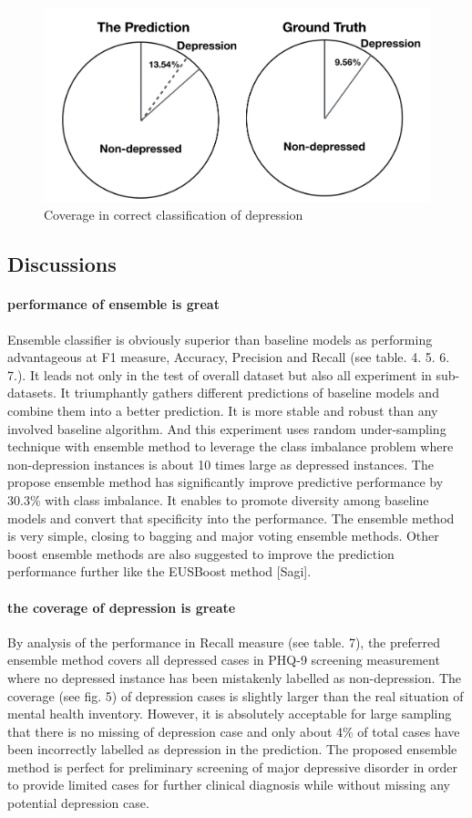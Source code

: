 \documentclass[runningheads]{llncs}
\begin{document}
\begin{figure}[h]
\includegraphics[width=1\textwidth]{coverage.png}
\caption{Coverage in correct classification of depression} \label{fig5}
\end{figure}
%
%
%
%
%
%
\subsection{Discussions}
\paragraph{performance of ensemble is great}
Ensemble classifier is obviously superior than baseline models as performing advantageous at F1 measure, Accuracy, Precision and Recall (see table. 4. 5. 6. 7.). It leads not only in the test of overall dataset but also all experiment in sub-datasets. It triumphantly gathers different predictions of baseline models and combine them into a better prediction. It is more stable and robust than any involved baseline algorithm. And this experiment uses random under-sampling technique with ensemble method to leverage the class imbalance problem where non-depression instances is about 10 times large as depressed instances. The propose ensemble method has significantly improve predictive performance by 30.3\% with class imbalance. It enables to promote diversity among baseline models and convert that specificity into the performance. The ensemble method is very simple, closing to bagging and major voting ensemble methods. Other boost ensemble methods are also suggested to improve the prediction performance further like the EUSBoost method [Sagi]. 
%
\paragraph{the coverage of depression is greate}
By analysis of the performance in Recall measure (see table. 7), the preferred ensemble method covers all depressed cases in PHQ-9 screening measurement where no depressed instance has been mistakenly labelled as non-depression. The coverage (see fig. 5) of depression cases is slightly larger than the real situation of mental health inventory. However, it is absolutely acceptable for large sampling that there is no missing of depression case and only about 4\% of total cases have been incorrectly labelled as depression in the prediction. The proposed ensemble method is perfect for preliminary screening of major depressive disorder in order to provide limited cases for further clinical diagnosis while without missing any potential depression case. 
%
%
%
%
%
\end{document}
